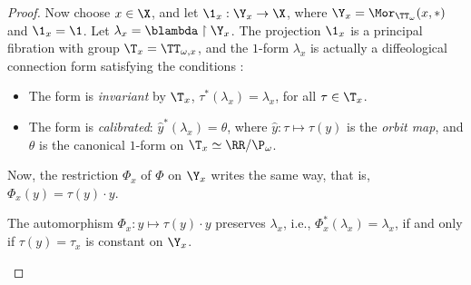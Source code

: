 \begin{proof}
    Now choose $x \in \X$,
    and let $\1_x : \Y_x \to \X$,
    where $\Y_x = \Mor_{\TT_\omega}(x,\ast)$ and $\1_x = \1$.
    Let $\lambda_x = \blambda \restriction \Y_x$.
    The projection $\1_x$ is a principal fibration with group $\T_x = \TT_{\omega,x}$,
    and the $1$-form $\lambda_x$ is actually a diffeological connection form satisfying the conditions \cite[]{PIZ13}:
    \begin{itemize}
      \item[$\ast$] The form is \emph{invariant} by $\T_x$, $\tau^*(\lambda_x) = \lambda_x$,
      for all $\tau \in \T_x$.
      \item[$\ast$] The form is \emph{calibrated}:
      $\hat y^*(\lambda_x) = \theta$,
      where $\hat y : \tau \mapsto \tau(y)$ is the \emph{orbit map},
      and $\theta$ is the canonical $1$-form on $\T_x \simeq \RR/\P_\omega$.
    \end{itemize}
    Now, the restriction $\Phi_x$ of $\Phi$ on $\Y_x$ writes the same way,
    that is,
    $\Phi_x(y) = \tau(y) \cdot y$.
    
    \begin{lemma}{}
      The automorphism $\Phi_x : y \mapsto \tau(y) \cdot y$ preserves $\lambda_x$,
      i.e.,
      $\Phi_x^*(\lambda_x) = \lambda_x$,
      if and only if $\tau(y) = \tau_x$ is constant on $\Y_x$.
    \end{lemma}
    

\end{proof}
